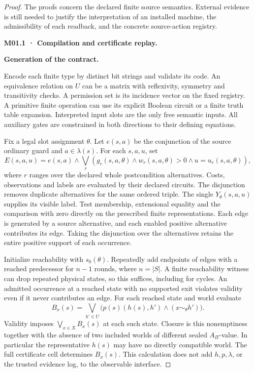 \begin{proof}

The proofs concern the declared finite source semantics. External evidence is still needed to justify the interpretation of an installed machine, the admissibility of each readback, and the concrete source-action registry.

\textbf{M01.1 · Compilation and certificate replay.}

\textbf{Generation of the contract.}

Encode each finite type by distinct bit strings and validate its code. An equivalence relation on \(U\) can be a matrix with reflexivity, symmetry and transitivity checks. A permission set is its incidence vector on the fixed registry. A primitive finite operation can use its explicit Boolean circuit or a finite truth table expansion. Interpreted input slots are the only free semantic inputs. All auxiliary gates are constrained in both directions to their defining equations.

Fix a legal slot assignment \(\theta\). Let \(e(s,a)\) be the conjunction of the source ordinary guard and \(a\in\lambda(s)\). For each \(s,a,u\), set
\[
 E(s,a,u) =
 e(s,a)\land
 \bigvee_{r}
  \left(g_r(s,a,\theta)\land w_r(s,a,\theta)>0\land u=u_r(s,a,\theta)\right),
\]
where \(r\) ranges over the declared whole postcondition alternatives. Costs, observations and labels are evaluated by their declared circuits. The disjunction removes duplicate alternatives for the same ordered triple. The single \(Y_\theta(s,a,u)\) supplies its visible label. Test membership, extensional equality and the comparison with zero directly on the prescribed finite representations. Each edge is generated by a source alternative, and each enabled positive alternative contributes its edge. Taking the disjunction over the alternatives retains the entire positive support of each occurrence.

Initialize reachability with \(s_0(\theta)\). Repeatedly add endpoints of edges with a reached predecessor for \(n-1\) rounds, where \(n=|S|\). A finite reachability witness can drop repeated physical states, so this suffices, including for cycles. An admitted occurrence at a reached state with no supported exit violates validity even if it never contributes an edge. For each reached state and world evaluate
\[
 B_x(s) = \bigvee_{h'\in U}\big(p(s)(h(s),h')\land (x\sim_\theta h')\big).
\]
Validity imposes \(\bigvee_{x\in X} B_x(s)\) at each such state. Closure is this nonemptiness together with the absence of two included worlds of different sealed \(A_\Pi\)-value. In particular the representative \(h(s)\) may have no directly compatible world. The full certificate cell determines \(B_x(s)\). This calculation does not add \(h,p,\lambda\), or the trusted evidence log, to the observable interface.


\end{proof}
